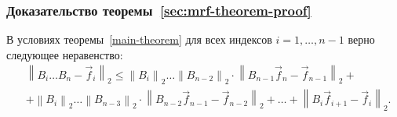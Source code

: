

\subsubsection{Доказательство теоремы~\ref{sec:mrf-theorem-proof}}

\begin{lemma}
\label{app:proof-of-theorem-2:lemma}
В условиях теоремы~\ref{main-theorem} для всех индексов $i = 1, \ldots, n - 1$ верно следующее неравенство:
\begin{equation}
\begin{aligned}
\label{app:proof-of-theorem-2:lemma:inequality}
&\left\| B_i \ldots B_n - \vec{f}_i \right\|_2 \leq
\left\| B_i \right\|_2 \ldots \left\| B_{n - 2} \right\|_2 \cdot \left\| B_{n - 1}\vec{f}_n - \vec{f}_{n - 1}\right\|_2 + \\
 &+ {} \left\| B_i \right\|_2 \ldots \left\| B_{n - 3} \right\|_2 \cdot \left\| B_{n - 2}\vec{f}_{n - 1} - \vec{f}_{n - 2} \right\|_2 +
{} \ldots + \left\| B_i\vec{f}_{i + 1} - \vec{f}_i \right\|_2.
\end{aligned}
\end{equation}
\end{lemma}


